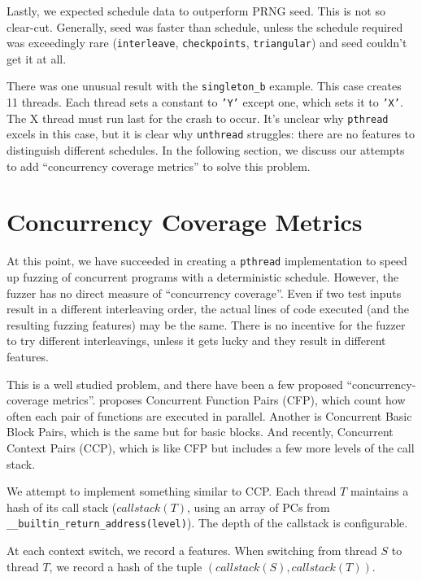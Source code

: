 \documentclass{article}
\begin{document}
Lastly, we expected schedule data to outperform PRNG seed. This is not so clear-cut. Generally, seed was faster than schedule, unless the schedule required was exceedingly rare (\texttt{interleave}, \texttt{checkpoints}, \texttt{triangular}) and seed couldn't get it at all.

There was one unusual result with the \texttt{singleton\_b} example. This case creates 11 threads. Each thread sets a constant to \texttt{'Y'} except one, which sets it to \texttt{'X'}. The X thread must run last for the crash to occur. It's unclear why \texttt{pthread} excels in this case, but it is clear why \texttt{unthread} struggles: there are no features to distinguish different schedules. In the following section, we discuss our attempts to add ``concurrency coverage metrics'' to solve this problem.

\section{Concurrency Coverage Metrics}\label{section:metrics}

At this point, we have succeeded in creating a \texttt{pthread} implementation to speed up fuzzing of concurrent programs with a deterministic schedule. However, the fuzzer has no direct measure of ``concurrency coverage''. Even if two test inputs result in a different interleaving order, the actual lines of code executed (and the resulting fuzzing features) may be the same. There is no incentive for the fuzzer to try different interleavings, unless it gets lucky and they result in different features.

\sloppy

This is a well studied problem, and there have been a few proposed ``concurrency-coverage metrics''. \cite{cfp} proposes Concurrent Function Pairs (CFP), which count how often each pair of functions are executed in parallel. Another is Concurrent Basic Block Pairs, which is the same but for basic blocks. And recently, Concurrent Context Pairs\cite{ccp} (CCP), which is like CFP but includes a few more levels of the call stack.

We attempt to implement something similar to CCP. Each thread $T$ maintains a hash of its call stack ($callstack(T)$, using an array of PCs from \texttt{\_\_builtin\_return\_address(level)}). The depth of the callstack is configurable.

\fussy

At each context switch, we record a features. When switching from thread $S$ to thread $T$, we record a hash of the tuple $(callstack(S), callstack(T))$.
\end{document}
